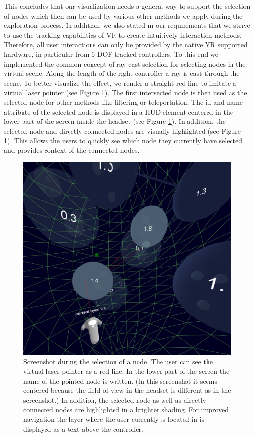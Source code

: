 This concludes that our visualization needs a general way to support the selection of nodes which then can be used by various other methods we apply during the exploration process. 
In addition, we also stated in our requirements that we strive to use the tracking capabilities of VR to create intuitively interaction methods.
Therefore, all user interactions can only be provided by the native VR supported hardware, in particular from 6-DOF tracked controllers. 
To this end we implemented the common concept of ray cast selection for selecting nodes in the virtual scene. Along the length of the right controller a ray is cast through the scene. To better visualize the effect, we render a straight red line to imitate a virtual laser pointer (see Figure \ref{fig:screenshot_interaction}). The first intersected node is then used as the selected node for other methods like filtering or teleportation. The id and name attribute of the selected node is displayed in a HUD element centered in the lower part of the screen inside the headset (see Figure \ref{fig:screenshot_interaction}). In addition, the selected node and directly connected nodes are visually highlighted (see Figure \ref{fig:screenshot_interaction}). This allows the users to quickly see which node they currently have selected and provides context of the connected nodes.

\begin{figure}[h]
    \centering
    \includegraphics[width=1\textwidth]{graphics/screenShotFilteringNodes2.jpg}
    \caption{Screenshot during the selection of a node. The user can see the virtual laser pointer as a red line. 
    In the lower part of the screen the name of the pointed node is written. (In this screenshot it seems centered because the field of view in the headset is different as in the screenshot.)    
    In addition, the selected node as well as directly connected nodes are highlighted in a brighter shading. For improved navigation the layer where the user currently is located in is displayed as a text above the controller.} 
    \label{fig:screenshot_interaction} 
\end{figure}

